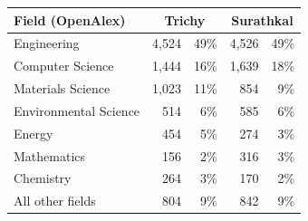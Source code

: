 \begin{tabular}{@{}lrrrr@{}}
\toprule
Field (OpenAlex) & \multicolumn{2}{c}{Trichy} & \multicolumn{2}{c}{Surathkal} \\
\midrule
Engineering & 4{,}524 & 49\% & 4{,}526 & 49\% \\
Computer Science & 1{,}444 & 16\% & 1{,}639 & 18\% \\
Materials Science & 1{,}023 & 11\% & 854 & 9\% \\
Environmental Science & 514 & 6\% & 585 & 6\% \\
Energy & 454 & 5\% & 274 & 3\% \\
Mathematics & 156 & 2\% & 316 & 3\% \\
Chemistry & 264 & 3\% & 170 & 2\% \\
All other fields & 804 & 9\% & 842 & 9\% \\
\bottomrule
\end{tabular}

